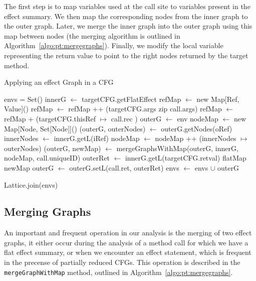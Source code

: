 \documentclass[a4paper]{article}
\begin{document}
The first step is to map variables used at the call site to variables present
in the effect summary. We then map the corresponding nodes from the inner graph
to the outer graph. Later, we merge the inner graph into the outer graph using this
map between nodes (the merging algorithm is outlined in
Algorithm~\ref{algo:pt:mergegraphs}). Finally, we modify the local variable
representing the return value to point to the right nodes returned by the
target method.


\begin{algorithm}
\caption{Applying an effect Graph in a CFG}\label{algo:pt:applyeffects}
\begin{algorithmic}[1]
    \State envs = Set()
        \State innerG $\gets$ targetCFG.getFlatEffect
        \State refMap $\gets$ new Map[Ref, Value]()
        \State refMap $\gets$ refMap ++ (targetCFG.args zip call.args)
        \State refMap $\gets$ refMap + (targetCFG.thisRef $\mapsto$ call.rec )
        \State
        \State outerG $\gets$ env
        \State nodeMap $\gets$ new Map[Node, Set[Node]]()
            \State (outerG, outerNodes) $\gets$ outerG.getNodes(oRef)
            \State innerNodes $\gets$ innerG.getL(iRef)
            \State nodeMap $\gets$ nodeMap ++ (innerNodes $\mapsto$ outerNodes)
        \EndFor
        \State
        \State (outerG, newMap) $\gets$ mergeGraphsWithMap(outerG, innerG, nodeMap, call.uniqueID)
        \State
        \State outerRet $\gets$ innerG.getL(targetCFG.retval) flatMap newMap
        \State outerG $\gets$ outerG.setL(call.ret, outerRet)
        \State
        \State envs $\gets$ envs $\cup$ outerG
    \EndFor

    \State \Return Lattice.join(envs)
\EndFunction
\end{algorithmic}
\end{algorithm}

\FloatBarrier

\subsection{Merging Graphs}
An important and frequent operation in our analysis is the merging of two effect
graphs, it either occur during the analysis of a method call for which we have
a flat effect summary, or when we encounter an effect statement, which is
frequent in the precense of partially reduced CFGs. This operation is described
in the \verb=mergeGraphWithMap= method, outlined in Algorithm~\ref{algo:pt:mergegraphs}.
\end{document}
